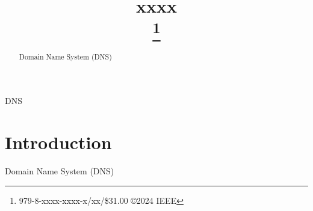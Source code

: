 \documentclass[conference]{IEEEtran}
\begin{document}
\title{xxxx  \\
{\footnotesize 
\thanks{979-8-xxxx-xxxx-x/xx/\$31.00 ©2024 IEEE}
}
}

\author{
}

\maketitle

\begin{abstract}
    Domain Name System (DNS) \cite{mockapetris1987domain} 
\end{abstract}

\begin{IEEEkeywords}
DNS 
\end{IEEEkeywords}

\section{Introduction}

Domain Name System (DNS) \cite{mockapetris1987domain} %



\end{document}
